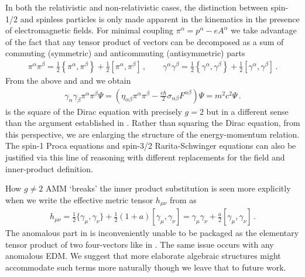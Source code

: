 In both the relativistic and non-relativistic cases, the distinction between spin-1/2 and spinless particles is only made apparent in the kinematics in the presence of electromagnetic fields. For minimal coupling $\pi^{\alpha}=p^{\alpha}-eA^{\alpha}$ we take advantage of the fact that any tensor product of vectors can be decomposed as a sum of commuting (symmetric) and anticommuting (antisymmetric) parts
\begin{align}
	\label{eq:spin:06} \pi^{\alpha}\pi^{\beta}=\frac{1}{2}\left\{\pi^{\alpha},\pi^{\beta}\right\}+
    \frac{1}{2}\left[\pi^{\alpha},\pi^{\beta}\right]\,,\qquad
    \gamma^{\alpha}\gamma^{\beta}=\frac{1}{2}\left\{\gamma^{\alpha},\gamma^{\beta}\right\}+
    \frac{1}{2}\left[\gamma^{\alpha},\gamma^{\beta}\right]\,.
\end{align}
From the above and  and  we obtain
\begin{align}
	\label{eq:spin:07b} \gamma_{\alpha}\gamma_{\beta}\pi^{\alpha}\pi^{\beta}\Psi=
    \left(\eta_{\alpha\beta}\pi^{\alpha}\pi^{\beta}-\frac{e\hbar}{2}\sigma_{\alpha\beta}F^{\alpha\beta}\right)\Psi=m^{2}c^{2}\Psi\,.
\end{align}
 is the square of the Dirac equation with precisely $g\!=\!2$ but in a different sense than the argument established in . Rather than squaring the Dirac equation, from this perspective, we are enlarging the structure of the energy-momentum relation. The spin-1 Proca equations and spin-3/2 Rarita-Schwinger equations can also be justified via this line of reasoning with different replacements for the field and inner-product definition.

How $g\!\neq\!2$ AMM `breaks' the inner product substitution is seen more explicitly when we write the effective metric tensor $h_{\mu\nu}$ from  as
\begin{gather}
    \label{spinstruc}
    h_{\mu\nu}=\frac{1}{2}\{\gamma_{\mu},\gamma_{\nu}\}+\frac{1}{2}(1+a)[\gamma_{\mu},\gamma_{\nu}]=\gamma_{\mu}\gamma_{\nu}+\frac{a}{2}[\gamma_{\mu},\gamma_{\nu}]\,.
\end{gather}
The anomalous part in  is inconveniently unable to be packaged as the elementary tensor product of two four-vectors like in . The same issue occurs with any anomalous EDM. We suggest that more elaborate algebraic structures might accommodate such terms more naturally though we leave that to future work.

